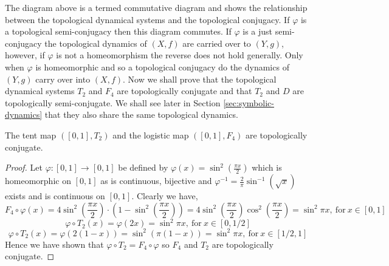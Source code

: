 \begin{center}
\end{center}

The diagram above is a termed commutative diagram and shows the relationship between the topological dynamical systems and the topological conjugacy. If $\varphi$ is a topological semi-conjugacy then this diagram commutes. If $\varphi$ is a just semi-conjugacy the topological dynamics of $(X, f)$ are carried over to $(Y, g)$, however, if $\varphi$ is not a homeomorphism the reverse does not hold generally. Only when $\varphi$ is homeomorphic and so a topological conjugacy do the dynamics of $(Y, g)$ carry over into $(X, f)$. Now we shall prove that the topological dynamical systems $T_2$ and $F_4$ are topologically conjugate and that $T_2$ and $D$ are topologically semi-conjugate. We shall see later in Section \ref{sec:symbolic-dynamics} that they also share the same topological dynamics.

\begin{prop} \label{prop:tent-logistic-conjugate}
    The tent map $([0, 1], T_2)$ and the logistic map $([0, 1], F_4)$ are topologically conjugate.
    \begin{proof}
        Let $\varphi: [0, 1] \to [0,1]$ be defined by $\varphi(x) = \sin^2(\frac{\pi x}{2})$ which is homeomorphic on $[0, 1]$ as is continuous, bijective and $\varphi^{-1} = \frac{2}{\pi} \sin^{-1}(\sqrt{x})$ exists and is continuous on $[0, 1]$. Clearly we have, \[F_4 \circ \varphi(x) = 4 \sin^2\left(\frac{\pi x}{2}\right) \cdot \left(1 - \sin^2\left(\frac{\pi x}{2}\right)\right) = 4 \sin^2\left(\frac{\pi x}{2}\right) \cos^2\left(\frac{\pi x}{2}\right) = \sin^2\pi x, \ \text{for} \ x \in [0, 1]\] \[\varphi \circ T_2(x) = \varphi(2x) = \sin^2\pi x, \ \text{for} \ x \in \left[0, 1/2\right]\] \[\varphi \circ T_2(x) = \varphi(2(1 - x)) = \sin^2 (\pi (1-x)) = \sin^2 \pi x, \ \text{for} \ x \in [1/2, 1]\] Hence we have shown that $\varphi \circ T_2 = F_4 \circ \varphi$ so $F_4$ and $T_2$ are topologically conjugate.
    \end{proof}
\end{prop}

